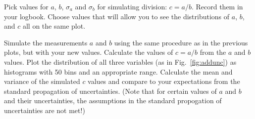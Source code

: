 Pick values for $a$, $b$, $\sigma_a$ and $\sigma_b$ for simulating
division: $c=a/b$. Record them in your logbook.  Choose values that
will allow you to see the distributions of $a$, $b$, and $c$ all
on the same plot.

\begin{plot}
Simulate the measurements $a$ and $b$ using the same procedure as in
the previous plots, but with your new values.  Calculate the values of
$c = a/b $ from the $a$ and $b$ values.  Plot the distribution of all
three variables (as in Fig.~\ref{fig:addunc}) as histograms with 50
bins and an appropriate range.  Calculate the mean and variance of the
simulated $c$ values and compare to your expectations from the
standard propagation of uncertainties.  (Note that for certain values
of $a$ and $b$ and their uncertainties, the assumptions in the
standard propogation of uncertainties are not met!)
\end{plot}

































